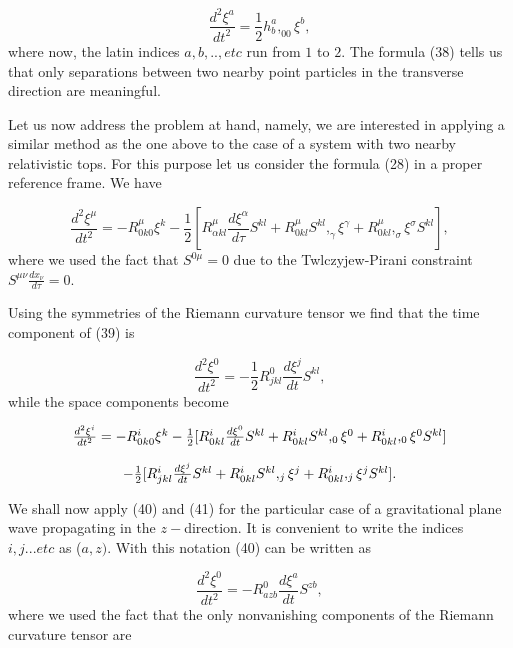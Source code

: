 \documentclass[a4paper,12pt]{article}
\begin{document}
\begin{equation}
\frac{d^{2}\xi ^{a}}{dt^{2}}=\frac{1}{2}h_{b}^{a},_{00}\xi ^{b},  \label{38}
\end{equation}
where now, the latin indices $a,b,..,etc$ run from $1$ to $2$. The formula
(38) tells us that only separations between two nearby point particles in
the transverse direction are meaningful.

Let us now address the problem at hand, namely, we are interested in
applying a similar method as the one above to the case of a system with two
nearby relativistic tops. For this purpose let us consider the formula (28)
in a proper reference frame. We have

\begin{equation}
\frac{d^{2}\xi ^{\mu }}{dt^{2}}=-R_{0k0}^{\mu }\xi ^{k}-\frac{1}{2}[%
R_{\alpha kl}^{\mu }\frac{d\xi ^{\alpha }}{d\tau }S^{kl}+R_{0kl}^{\mu
}S^{kl},_{\gamma }\xi ^{\gamma }+R_{0kl}^{\mu },_{\sigma }\xi ^{\sigma
}S^{kl}],  \label{39}
\end{equation}
where we used the fact that $S^{0\mu }=0$ due to the Twlczyjew-Pirani
constraint $S^{\mu \nu }\frac{dx_{\nu }}{d\tau }=0$.

Using the symmetries of the Riemann curvature tensor we find that the time
component of (39) is

\begin{equation}
\frac{d^{2}\xi^{0}}{dt^{2}}=-\frac{1}{2}R_{jkl}^{0}\frac{d\xi^{j}}{dt}S^{kl},
\label{40}
\end{equation}
while the space components become

\begin{equation}
\begin{array}{c}
\frac{d^{2}\xi^{i}}{dt^{2}}=-R_{0k0}^{i}\xi^{k}-\frac{1}{2}[R_{0kl}^{i}\frac{%
d\xi^{0}}{dt}S^{kl}+R_{0kl}^{i}S^{kl},_{0}\xi^{0}+R_{0kl}^{i},_{0}%
\xi^{0}S^{kl}] \\ 
\\ 
-\frac{1}{2}[R_{jkl}^{i}\frac{d\xi^{j}}{dt}S^{kl}+R_{0kl}^{i}S^{kl},_{j}%
\xi^{j}+R_{0kl}^{i},_{j}\xi^{j}S^{kl}].
\end{array}
\label{41}
\end{equation}

We shall now apply (40) and (41) for the particular case of a gravitational
plane wave propagating in the $z-$direction. It is convenient to write the
indices $i,j...etc$ as ($a,z).$ With this notation (40) can be written as

\begin{equation}
\frac{d^{2}\xi ^{0}}{dt^{2}}=-R_{azb}^{0}\frac{d\xi ^{a}}{dt}S^{zb},
\label{42}
\end{equation}
where we used the fact that the only nonvanishing components of the Riemann
curvature tensor are
\end{document}
